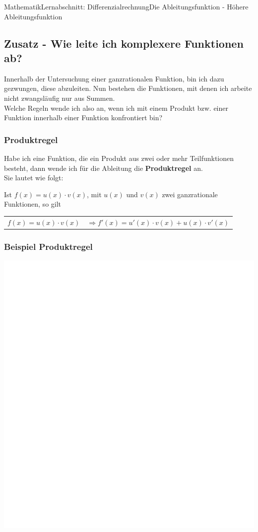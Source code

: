 \documentclass[11pt,twocolumn,oneside,openany,headings=optiontotoc,11pt,numbers=noenddot]{article}
\begin{document}
	\begin{worksheet}{Mathematik}{Lernabschnitt: Differenzialrechnung}{Die Ableitungsfunktion - Höhere Ableitungsfunktion}
		\setcounter{section}{7}
		\setcounter{subsection}{3}
		\setcounter{subsubsection}{5}
		\subsection*{Zusatz - Wie leite ich komplexere Funktionen ab?}
		Innerhalb der Untersuchung einer ganzrationalen Funktion, bin ich dazu gezwungen, diese abzuleiten. Nun bestehen die Funktionen, mit denen ich arbeite nicht zwangsläufig nur aus Summen.\\
		Welche Regeln wende ich also an, wenn ich mit einem Produkt bzw. einer Funktion innerhalb einer Funktion konfrontiert bin?
		\subsubsection{Produktregel}
		Habe ich eine Funktion, die ein Produkt aus zwei oder mehr Teilfunktionen besteht, dann wende ich für die Ableitung die \textbf{Produktregel} an.\\
		Sie lautet wie folgt:
		\begin{framed}
			\noindent
			Ist \(f(x) = u(x)\cdot{}v(x)\), mit \(u(x)\) und \(v(x)\) zwei ganzrationale Funktionen, so gilt
			\begin{tabularx}{0.7\textwidth}{XX}
				\(f(x) = u(x)\cdot{}v(x)\) & \(\Rightarrow f'(x) = u'(x)\cdot{}v(x) + u(x)\cdot{}v'(x)\)\\
			\end{tabularx}
		\end{framed}
		\subsubsection*{Beispiel Produktregel}
		\includegraphics[scale=0.2]{../../empty.jpg}\\

\end{worksheet}
\end{document}
